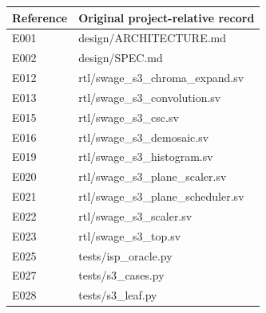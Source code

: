 \documentclass[11pt,a4paper]{article}
\begin{document}
{\small\renewcommand{\arraystretch}{1.18}\begin{longtable}{@{}L{0.12\textwidth}|L{0.82\textwidth}@{}}\toprule

\textbf{Reference} & \textbf{Original project-relative record}\\\midrule\endhead

E001 & design/\allowbreak{}ARCHITECTURE.md\\[2pt]\hline

E002 & design/\allowbreak{}SPEC.md\\[2pt]\hline

E012 & rtl/\allowbreak{}swage\_\allowbreak{}s3\_\allowbreak{}chroma\_\allowbreak{}expand.sv\\[2pt]\hline

E013 & rtl/\allowbreak{}swage\_\allowbreak{}s3\_\allowbreak{}convolution.sv\\[2pt]\hline

E015 & rtl/\allowbreak{}swage\_\allowbreak{}s3\_\allowbreak{}csc.sv\\[2pt]\hline

E016 & rtl/\allowbreak{}swage\_\allowbreak{}s3\_\allowbreak{}demosaic.sv\\[2pt]\hline

E019 & rtl/\allowbreak{}swage\_\allowbreak{}s3\_\allowbreak{}histogram.sv\\[2pt]\hline

E020 & rtl/\allowbreak{}swage\_\allowbreak{}s3\_\allowbreak{}plane\_\allowbreak{}scaler.sv\\[2pt]\hline

E021 & rtl/\allowbreak{}swage\_\allowbreak{}s3\_\allowbreak{}plane\_\allowbreak{}scheduler.sv\\[2pt]\hline

E022 & rtl/\allowbreak{}swage\_\allowbreak{}s3\_\allowbreak{}scaler.sv\\[2pt]\hline

E023 & rtl/\allowbreak{}swage\_\allowbreak{}s3\_\allowbreak{}top.sv\\[2pt]\hline

E025 & tests/\allowbreak{}isp\_\allowbreak{}oracle.py\\[2pt]\hline

E027 & tests/\allowbreak{}s3\_\allowbreak{}cases.py\\[2pt]\hline

E028 & tests/\allowbreak{}s3\_\allowbreak{}leaf.py\\[2pt]\hline


\end{longtable}}
\end{document}
